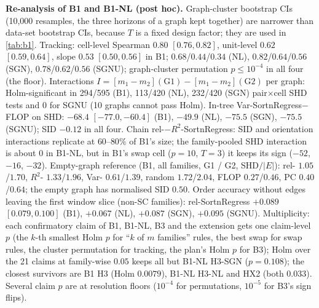 \textbf{Re-analysis of B1 and B1-NL (post hoc).} Graph-cluster bootstrap CIs
(10{,}000 resamples, the three horizons of a graph kept together) are narrower
than data-set bootstrap CIs, because $T$ is a fixed design
factor; they are used in \cref{tab:b1}. Tracking: cell-level Spearman $0.80$
$[0.76,0.82]$, unit-level $0.62$ $[0.59,0.64]$, slope $0.53$ $[0.50,0.56]$ in B1;
$0.68$/$0.44$/$0.34$ (NL), $0.82$/$0.64$/$0.56$ (SGN), $0.78$/$0.62$/$0.56$ (SGNU);
graph-cluster permutation $p\le10^{-4}$ in all four (the floor). Interactions
$I=[m_1-m_2](\mathrm{G1})-[m_1-m_2](\mathrm{G2})$ per graph: Holm-significant in
294/595 (B1), 113/420 (NL), 232/420 (SGN) pair$\times$cell SHD tests and 0 for
SGNU (10 graphs cannot pass Holm). In-tree Var-SortnRegress$-$FLOP on SHD:
$-68.4$ $[-77.0,-60.4]$ (B1), $-49.9$ (NL), $-75.5$ (SGN), $-75.5$ (SGNU); SID
$-0.12$ in all four. Chain rel-$-R^2$-SortnRegress: SID and orientation
interactions replicate at $60$--$80\%$ of B1's size; the family-pooled SHD
interaction is about $0$ in B1-NL, but in B1's swap cell ($p=10$, $T=3$) it keeps
its sign ($-52$, $-16$, $-32$). Empty-graph reference (B1, all families, G1 / G2,
SHD$/|E|$): rel- $1.05$/$1.70$, $R^2$- $1.33$/$1.96$, Var- $0.61$/$1.39$,
random $1.72$/$2.04$, FLOP $0.27$/$0.46$, PC $0.40$/$0.64$; the empty graph has
normalised SID $0.50$. Order accuracy without edges leaving the first window
slice (non-SC families): rel-SortnRegress $+0.089$ $[0.079,0.100]$ (B1), $+0.067$
(NL), $+0.087$ (SGN), $+0.095$ (SGNU). Multiplicity: each confirmatory claim of
B1, B1-NL, B3 and the extension gets one claim-level $p$ (the $k$-th smallest
Holm $p$ for ``$k$ of $m$ families'' rules, the best swap for swap rules, the
cluster permutation for tracking, the plan's Holm $p$ for B3); Holm over the 21
claims at family-wise $0.05$ keeps all but B1-NL H3-SGN ($p=0.108$); the closest
survivors are B1 H3 (Holm $0.0079$), B1-NL H3-NL and HX2 (both $0.033$). Several
claim $p$ are at resolution floors ($10^{-4}$ for permutations, $10^{-5}$ for
B3's sign flips).

